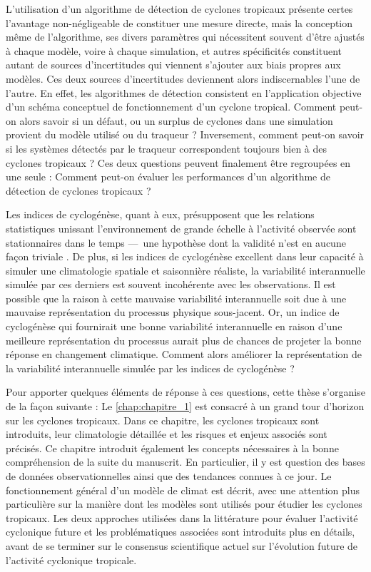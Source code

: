 \documentclass[../main.tex]{subfiles}
\begin{document}
L'utilisation d'un algorithme de détection de cyclones tropicaux présente certes l'avantage non-négligeable de constituer une mesure directe, mais la conception
même de l'algorithme, ses divers paramètres qui nécessitent souvent d'être ajustés à chaque modèle, voire à chaque simulation, et autres spécificités
constituent autant de sources d'incertitudes qui viennent s'ajouter aux biais propres aux modèles. Ces deux sources d'incertitudes deviennent alors
indiscernables l'une de l'autre. En effet, les algorithmes de détection consistent en l'application objective d'un schéma conceptuel de fonctionnement d'un
cyclone tropical. Comment peut-on alors savoir si un défaut, ou un surplus de cyclones dans une simulation provient du modèle utilisé ou du traqueur ?
Inversement, comment peut-on savoir si les systèmes détectés par le traqueur correspondent toujours bien à des cyclones tropicaux ? Ces deux questions peuvent
finalement être regroupées en une seule : Comment peut-on évaluer les performances d'un algorithme de détection de cyclones tropicaux ?

Les indices de cyclogénèse, quant à eux, présupposent que les relations statistiques unissant l'environnement de grande échelle à l'activité observée sont
stationnaires dans le temps ---~une hypothèse dont la validité n'est en aucune façon triviale \parencite{nolan_increased_2008,murakami_changes_2013}. De plus,
si les indices de cyclogénèse excellent dans leur capacité à simuler une climatologie spatiale et saisonnière réaliste, la variabilité interannuelle simulée par
ces derniers est souvent incohérente avec les observations. Il est possible que la raison à cette mauvaise variabilité interannuelle soit due à une mauvaise
représentation du processus physique sous-jacent. Or, un indice de cyclogénèse qui fournirait une bonne variabilité interannuelle en raison d'une meilleure
représentation du processus aurait plus de chances de projeter la bonne réponse en changement climatique. Comment alors améliorer la représentation de la
variabilité interannuelle simulée par les indices de cyclogénèse ?

Pour apporter quelques éléments de réponse à ces questions, cette thèse s'organise de la façon suivante : Le \cref{chap:chapitre_1} est consacré à un grand tour
d'horizon sur les cyclones tropicaux. Dans ce chapitre, les cyclones tropicaux sont introduits, leur climatologie détaillée et les risques et enjeux associés
sont précisés. Ce chapitre introduit également les concepts nécessaires à la bonne compréhension de la suite du manuscrit. En particulier, il y est question des
bases de données observationnelles ainsi que des tendances connues à ce jour. Le fonctionnement général d'un modèle de climat est décrit, avec une attention
plus particulière sur la manière dont les modèles sont utilisés pour étudier les cyclones tropicaux. Les deux approches utilisées dans la littérature pour
évaluer l'activité cyclonique future et les problématiques associées sont introduits plus en détails, avant de se terminer sur le consensus scientifique actuel
sur l'évolution future de l'activité cyclonique tropicale.
\end{document}
